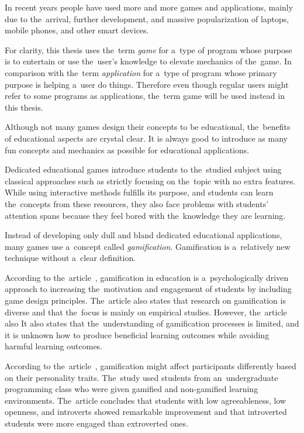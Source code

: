 In recent years people have used more and more games and applications, mainly due to the~arrival, further development, and massive popularization of laptops, mobile phones, and other smart devices.

For clarity, this thesis uses the~term \emph{game} for a~type of program whose purpose is to entertain or use the~user's knowledge to elevate mechanics of the~game. In comparison with the~term \emph{application} for a~type of program whose primary purpose is helping a~user do things. Therefore even though regular users might refer to some programs as applications, the~term game will be used instead in this thesis.

Although not many games design their concepts to be educational, the~benefits of educational aspects are crystal clear.
It is always good to introduce as many fun concepts and mechanics as possible for educational applications.

Dedicated educational games introduce students to the~studied subject using classical approaches such as strictly focusing on the~topic with no extra features.
While using interactive methods fulfills its purpose, and students can learn the~concepts from these resources, they also face problems with students' attention spans because they feel bored with the~knowledge they are learning.

Instead of developing only dull and bland dedicated educational applications, many games use a~concept called \emph{gamification}.
Gamification is a~relatively new technique without a~clear definition.

According to the~article~\cite{dichev_2017_gamifying}, gamification in education is a~psychologically driven approach to increasing the~motivation and engagement of students by including game design principles.
The~article also states that research on gamification is diverse and that the~focus is mainly on empirical studies. However, the~article also 
It also states that the~understanding of gamification processes is limited, and it is unknown how to produce beneficial learning outcomes while avoiding harmful learning outcomes. 

According to the~article~\cite{smiderle_2020_the}, gamification might affect participants differently based on their personality traits.
The~study used students from an~undergraduate programming class who were given gamified and non-gamified learning environments.
The~article concludes that students with low agreeableness, low openness, and introverts showed remarkable improvement and that introverted students were more engaged than extroverted ones.

